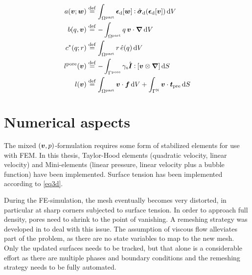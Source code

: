 \documentclass[MikaelDissertation.tex]{subfiles}
\begin{document}
\begin{align}
    a(\boldsymbol{v};\boldsymbol{w}) &\overset{\mathrm{def}}{=}
    \int_{\Omega^{\mathrm{part}}}  \boldsymbol{\epsilon}_{\mathrm{d}}[\boldsymbol{w}]\mathbin{\vcentcolon} \hat{\boldsymbol{\sigma}}_{\mathrm{d}}(\boldsymbol{\epsilon}_{\mathrm{d}}[\boldsymbol{v}]) \operatorname{d \!} V
\label{eq3a} \\
    b(q,\boldsymbol{v}) &\overset{\mathrm{def}}{=}
    - \int_{\Omega^{\mathrm{part}}}  q\,\boldsymbol{v}\cdot\boldsymbol{\nabla} \operatorname{d \!} V
\label{eq3b} \\
    c^*(q;r) &\overset{\mathrm{def}}{=}
    \int_{\Omega^{\mathrm{part}}}  r\,\hat{e}(q) \operatorname{d \!} V
\label{eq3c} \\
    l^{\mathrm{pore}}(\boldsymbol{v}) &\overset{\mathrm{def}}{=} -\int_{\Gamma^{\mathrm{pore}}} \gamma_{\mathrm{s}} \hat{\boldsymbol{I}} \mathbin{\vcentcolon} [\boldsymbol{v}\mathbin{\otimes}\boldsymbol{\nabla}] \operatorname{d \!} S 
\label{eq3d} \\
    l(\boldsymbol{v}) &\overset{\mathrm{def}}{=} \int_{\Omega^{\mathrm{part}}} \boldsymbol{v}\cdot\boldsymbol{f} \operatorname{d \!} V + \int_{\Gamma^{\mathrm{N}}} \boldsymbol{v}\cdot \boldsymbol{t}_{\mathrm{pre}} \operatorname{d \!} S
\label{eq3e}
\end{align}

\section{Numerical aspects}
The mixed $(\boldsymbol{v},p)$-formulation requires some form of stabilized elements for use with FEM. In this thesis, Taylor-Hood elements (quadratic velocity, linear velocity) and Mini-elements (linear pressure, linear velocity plus a bubble function) have been implemented.
Surface tension has been implemented according to \cref{eq3d}.

During the FE-simulation, the mesh eventually becomes very distorted, in particular at sharp corners subjected to surface tension.
In order to approach full density, pores need to shrink to the point of vanishing. 
A remeshing strategy was developed in  to deal with this issue.
The assumption of viscous flow alleviates part of the problem, as there are no state variables to map to the new mesh.
Only the updated surfaces needs to be tracked, but that alone is a considerable effort as there are multiple phases and boundary conditions and the remeshing strategy needs to be fully automated.
\end{document}
